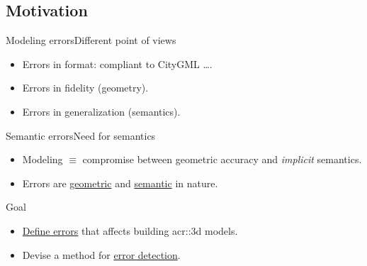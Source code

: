\documentclass[10pt]{beamer}
\begin{document}
        \subsection{Motivation}
            \begin{frame}{Modeling errors}{Different point of views}
                \begin{itemize}[label=$\blacktriangleright$, font=\color{IGNGreen}]
                    \item<1-> Errors in format: compliant to CityGML \dots.
                    \item<2-> Errors in fidelity (geometry).
                    \item<3-> Errors in generalization (semantics).
                \end{itemize}
            \end{frame}

            \begin{frame}{Semantic errors}{Need for semantics}
                \begin{itemize}[label=$\blacktriangleright$, font=\color{IGNGreen}]
                    \item<1-> Modeling \(\equiv\) compromise between geometric accuracy and \textit{implicit} semantics.
                    \item<2-> Errors are \underline{geometric} and \underline{semantic} in nature.
                \end{itemize}
            \end{frame}
        
            \begin{frame}{Goal}
                \begin{itemize}[label=$\blacktriangleright$, font=\color{IGNGreen}]
                    \item<1-> \underline{Define errors} that affects building \gls{acr::3d} models.
                    \item<2-> Devise a method for \underline{error detection}.
                \end{itemize}
            \end{frame}
\end{document}
